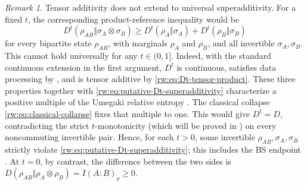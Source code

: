 \documentclass[11pt]{article}
\theoremstyle{remark}
\newtheorem{remark}[remark]{Remark}
\newcommand{\1}{\mathbbm{1}}
\begin{document}
\begin{remark}{Tensor additivity does not extend to universal
superadditivity.}
For a fixed $t$, the corresponding product-reference inequality
would be
\begin{equation}
 D^t(\rho_{AB}\Vert\sigma_A\otimes\sigma_B)
 \geq D^t(\rho_A\Vert\sigma_A)
       +D^t(\rho_B\Vert\sigma_B)
 \label{rw:eq:putative-Dt-superadditivity}
\end{equation}
for every bipartite state $\rho_{AB}$, with marginals $\rho_A$ and
$\rho_B$, and all invertible $\sigma_A,\sigma_B$.  This cannot hold
universally for any
$t\in(0,1]$.  Indeed, with the standard continuous extension in the
first argument, $D^t$ is continuous, satisfies data processing by
, and is tensor additive by
\eqref{rw:eq:Dt-tensor-product}.  These three properties together
with \eqref{rw:eq:putative-Dt-superadditivity} characterize a positive
multiple of the Umegaki relative entropy
\cite[Theorem~1]{wilming2017axiomatic}.  The classical collapse
\eqref{rw:eq:classical-collapse} fixes that multiple to one.  This
would give $D^t=D$, contradicting the strict $t$-monotonicity (which will be proved in
) on every noncommuting
invertible pair.  Hence, for each $t>0$, some invertible
$\rho_{AB},\sigma_A,\sigma_B$ strictly violate
\eqref{rw:eq:putative-Dt-superadditivity}; this
includes the BS endpoint
\cite[Section~3, Eq.~(13) and Fig.~1]
{BluhmCapelPerezHernandez-WeakQFBSentropy-2021}.  At $t=0$, by contrast, the difference
between the two sides is
$D(\rho_{AB}\Vert\rho_A\otimes\rho_B)=I(A:B)_\rho\geq0$.
\end{remark}
\end{document}
